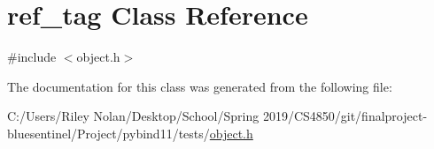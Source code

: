 \hypertarget{classref__tag}{}\section{ref\+\_\+tag Class Reference}
\label{classref__tag}


{\ttfamily \#include $<$object.\+h$>$}



The documentation for this class was generated from the following file\+:\begin{DoxyCompactItemize}
\item 
C\+:/\+Users/\+Riley Nolan/\+Desktop/\+School/\+Spring 2019/\+C\+S4850/git/finalproject-\/bluesentinel/\+Project/pybind11/tests/\mbox{\hyperlink{pybind11_2tests_2object_8h}{object.\+h}}\end{DoxyCompactItemize}
